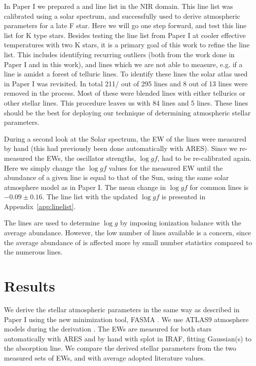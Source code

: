 \documentclass{aa}
\begin{document}
In Paper I we prepared a  and  line list in the NIR
domain. This line list was calibrated using a solar spectrum, and successfully
used to derive atmospheric parameters for a late F star. Here we will go one
step forward, and test this line list for K type stars. Besides testing the line
list from Paper I at cooler effective temperatures with two K stars, it is a
primary goal of this work to refine the line list. This includes identifying
recurring outliers (both from the work done in Paper I and in this work), and
lines which we are not able to measure, e.g. if a line is amidst a forest of
telluric lines. To identify these lines the solar atlas used in Paper I was
revisited. In total 211/ out of 295  lines and 8 out of 13
 lines were removed in the process. Most of these were blended lines
with either tellurics or other stellar lines. This procedure leaves us with 84
 lines and 5  lines. These lines should be the best for
deploying our technique of determining atmospheric stellar parameters.

During a second look at the Solar spectrum, the EW of the lines were measured by
hand (this had previously been done automatically with ARES). Since we
re-measured the EWs, the oscillator strengths, $\log \mathit{gf}$, had to be
re-calibrated again. Here we simply change the $\log \mathit{gf}$ values for the
measured EW until the abundance of a given line is equal to that of the Sun,
using the same solar atmosphere model as in Paper I. The mean change in $\log
\mathit{gf}$ for common lines is $-0.09 \pm 0.16$. The line list with the
updated $\log \mathit{gf}$ is presented in Appendix~\ref{app:linelist}.

The  lines are used to determine $\log g$ by imposing ionization
balance with the average  abundance. However, the low number of
 lines available is a concern, since the average abundance of
 is affected more by small number statistics compared to the
numerous  lines.



\section{Results}
\label{sec:results}

We derive the stellar atmospheric parameters in the same way as described in
Paper I using the new minimization tool, FASMA \citep{Andreasen2017a}. We use
ATLAS9 atmosphere models during the derivation \citep{Kurucz1993}. The EWs are
measured for both stars automatically with ARES \citep{Sousa2015a} and by hand
with splot in IRAF, fitting Gaussian(s) to the absorption line. We compare the
derived stellar parameters from the two measured sets of EWs, and with average
adopted literature values.
\end{document}
